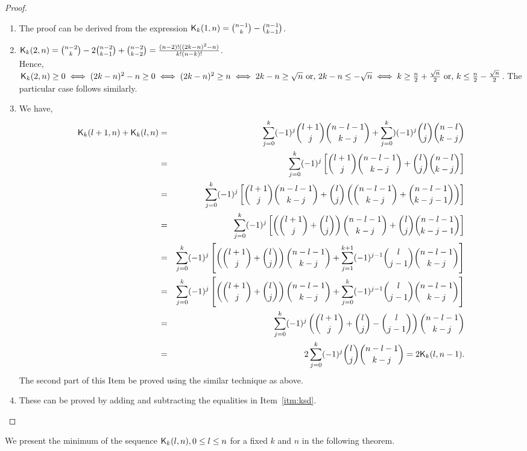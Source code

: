 \documentclass{llncs}
\begin{document}
\begin{proof}
\begin{enumerate}
\item The proof can be derived from the expression $\mathsf{K}_{k}(1,n) = {n-1 \choose k} - {n-1 \choose k-1}$.
\item $\mathsf{K}_{k}(2,n) = {n-2 \choose k} - 2{n-2 \choose k-1} + {n-2 \choose k-2} = \frac{(n-2)!((2k-n)^2-n)}{k!(n-k)!}$.\\
Hence, $\mathsf{K}_{k}(2,n) \geq 0 \iff (2k-n)^2-n \geq 0 \iff (2k-n)^2 \geq n \iff 2k-n \geq \sqrt{n} \text{ or, } 2k-n \leq -\sqrt{n} \iff k \geq \frac{n}{2}+\frac{\sqrt{n}}{2} \text{ or, } k \leq \frac{n}{2}-\frac{\sqrt{n}}{2}$.
The particular case follows similarly.
\item We have,
\begin{eqnarray*}
 \mathsf{K}_{k}(l+1,n) + \mathsf{K}_{k}(l,n) & = & \sum_{j=0}^k (-1)^j{l+1 \choose j} {n-l-1 \choose k-j} + \sum_{j=0}^k)(-1)^j{l \choose j} {n-l \choose k-j} \\
 & = & \sum_{j=0}^k(-1)^j\left[{l+1 \choose j} {n-l-1 \choose k-j} + {l \choose j} {n-l \choose k-j}\right] \\
 & = & \sum_{j=0}^k(-1)^j\left[{l+1 \choose j} {n-l-1 \choose k-j} + {l \choose j} \left({n-l-1 \choose k-j} + {n-l-1 \choose k-j-1}\right)\right] \\
 & = & \sum_{j=0}^k(-1)^j\left[\left({l+1 \choose j} + {l \choose j}\right){n-l-1 \choose k-j} + {l \choose j} {n-l-1 \choose k-j-1}\right]\\
 & = & \sum_{j=0}^k(-1)^j\left[\left({l+1 \choose j} + {l \choose j}\right){n-l-1 \choose k-j} + \sum_{j=1}^{k+1}(-1)^{j-1}{l \choose j-1} {n-l-1 \choose k-j}\right]\\
 & = & \sum_{j=0}^k(-1)^j\left[\left({l+1 \choose j} + {l \choose j}\right){n-l-1 \choose k-j} + \sum_{j=0}^k(-1)^{j-1}{l \choose j-1} {n-l-1 \choose k-j}\right]\\
 & = & \sum_{j=0}^k(-1)^j\left({l+1 \choose j} + {l \choose j}-{l \choose j-1}\right){n-l-1 \choose k-j}\\
 & = & 2\sum_{j=0}^k(-1)^j {l \choose j}{n-l-1 \choose k-j} = 2\mathsf{K}_{k}(l,n-1).
\end{eqnarray*}
The second part of this Item be proved using the similar technique as above.
\item These can be proved by adding and subtracting the equalities in Item~\ref{itm:ksd}.
\end{enumerate}
\end{proof}
We present the minimum of the sequence $\mathsf{K}_{k}(l,n), 0 \leq l \leq n$ for a fixed $k$ and $n$ in the following theorem.
\end{document}
